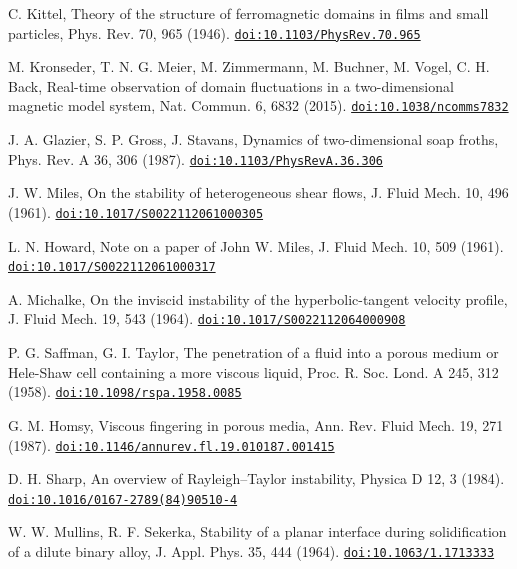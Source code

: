 \documentclass[11pt,a4paper]{article}
\begin{document}
\begin{description}[leftmargin=2.6em,labelwidth=2.2em,labelsep=0.4em,itemsep=1pt,parsep=0pt,font=\normalfont]
\item[{[30]}] C. Kittel, Theory of the structure of ferromagnetic domains in films and small particles, Phys. Rev. 70, 965 (1946). \href{https://doi.org/10.1103/PhysRev.70.965}{\nolinkurl{doi:10.1103/PhysRev.70.965}}
\item[{[31]}] M. Kronseder, T. N. G. Meier, M. Zimmermann, M. Buchner, M. Vogel, C. H. Back, Real-time observation of domain fluctuations in a two-dimensional magnetic model system, Nat. Commun. 6, 6832 (2015). \href{https://doi.org/10.1038/ncomms7832}{\nolinkurl{doi:10.1038/ncomms7832}}
\item[{[32]}] J. A. Glazier, S. P. Gross, J. Stavans, Dynamics of two-dimensional soap froths, Phys. Rev. A 36, 306 (1987). \href{https://doi.org/10.1103/PhysRevA.36.306}{\nolinkurl{doi:10.1103/PhysRevA.36.306}}
\item[{[33]}] J. W. Miles, On the stability of heterogeneous shear flows, J. Fluid Mech. 10, 496 (1961). \href{https://doi.org/10.1017/S0022112061000305}{\nolinkurl{doi:10.1017/S0022112061000305}}
\item[{[34]}] L. N. Howard, Note on a paper of John W. Miles, J. Fluid Mech. 10, 509 (1961). \href{https://doi.org/10.1017/S0022112061000317}{\nolinkurl{doi:10.1017/S0022112061000317}}
\item[{[35]}] A. Michalke, On the inviscid instability of the hyperbolic-tangent velocity profile, J. Fluid Mech. 19, 543 (1964). \href{https://doi.org/10.1017/S0022112064000908}{\nolinkurl{doi:10.1017/S0022112064000908}}
\item[{[36]}] P. G. Saffman, G. I. Taylor, The penetration of a fluid into a porous medium or Hele-Shaw cell containing a more viscous liquid, Proc. R. Soc. Lond. A 245, 312 (1958). \href{https://doi.org/10.1098/rspa.1958.0085}{\nolinkurl{doi:10.1098/rspa.1958.0085}}
\item[{[37]}] G. M. Homsy, Viscous fingering in porous media, Ann. Rev. Fluid Mech. 19, 271 (1987). \href{https://doi.org/10.1146/annurev.fl.19.010187.001415}{\nolinkurl{doi:10.1146/annurev.fl.19.010187.001415}}
\item[{[38]}] D. H. Sharp, An overview of Rayleigh–Taylor instability, Physica D 12, 3 (1984). \href{https://doi.org/10.1016/0167-2789(84)90510-4}{\nolinkurl{doi:10.1016/0167-2789(84)90510-4}}
\item[{[39]}] W. W. Mullins, R. F. Sekerka, Stability of a planar interface during solidification of a dilute binary alloy, J. Appl. Phys. 35, 444 (1964). \href{https://doi.org/10.1063/1.1713333}{\nolinkurl{doi:10.1063/1.1713333}}

\end{description}
\end{document}
